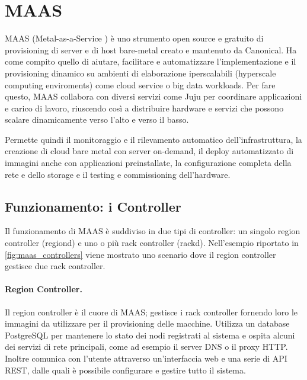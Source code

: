 \section{MAAS}\label{subsec:maas}

MAAS (Metal-as-a-Service \cite{maas_home}) è uno strumento open source e gratuito di provisioning di server e di host bare-metal creato e mantenuto da Canonical.
%
Ha come compito quello di aiutare, facilitare e automatizzare l'implementazione e il provisioning dinamico su ambienti di elaborazione iperscalabili (hyperscale computing enviroments) come cloud service o big data workloads.
% 
Per fare questo, MAAS collabora con diversi servizi come Juju per coordinare applicazioni e carico di lavoro, riuscendo così a distribuire hardware e servizi che possono scalare dinamicamente verso l'alto e verso il basso.

Permette quindi il monitoraggio e il rilevamento automatico dell'infrastruttura, la creazione di cloud bare metal con server on-demand, il deploy automatizzato di immagini anche con applicazioni preinstallate, la configurazione completa della rete e dello storage e il testing e commissioning dell'hardware.



\subsection{Funzionamento: i Controller}
Il funzionamento di MAAS è suddiviso in due tipi di controller: un singolo region controller (regiond) e uno o più rack controller (rackd).
% 
Nell'esempio riportato in \cref{fig:maas_controllers} viene mostrato uno scenario dove il region controller gestisce due rack controller.

\paragraph{Region Controller.}
Il region controller è il cuore di MAAS; gestisce i rack controller fornendo loro le immagini da utilizzare per il provisioning delle macchine. Utilizza un database PostgreSQL per mantenere lo stato dei nodi registrati al sistema e ospita alcuni dei servizi di rete principali, come ad esempio il server DNS o il proxy HTTP.
%
Inoltre comunica con l'utente attraverso un'interfaccia web e una serie di API REST, dalle quali è possibile configurare e gestire tutto il sistema.

